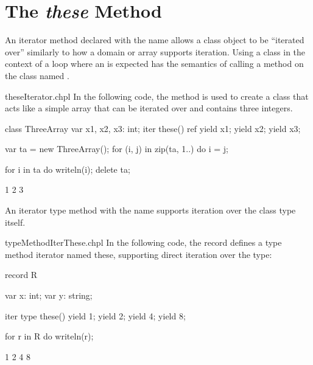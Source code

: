 \section{The {\em these} Method}
\label{The_these_Method}

An iterator method declared with the name  allows a class object to be
``iterated over'' similarly to how a domain or array supports iteration.
Using a class in the context of a loop where
an  is expected has the semantics of calling
a method on the class named .

\begin{chapelexample}{theseIterator.chpl}
In the following code, the  method is used to create a
class that acts like a simple array that can be iterated over and
contains three integers.
\begin{chapel}
class ThreeArray {
  var x1, x2, x3: int;
  iter these() ref {
    yield x1;
    yield x2;
    yield x3;
  }
}
\end{chapel}
\begin{chapelpost}
var ta = new ThreeArray();
for (i, j) in zip(ta, 1..) do
  i = j;

for i in ta do
  writeln(i);
delete ta;
\end{chapelpost}
\begin{chapeloutput}
1
2
3
\end{chapeloutput}

\end{chapelexample}

An iterator type method with the name  supports iteration
over the class type itself.

\begin{chapelexample}{typeMethodIterThese.chpl}
In the following code, the record  defines a type method
iterator named these, supporting direct iteration over the type:
\begin{chapel}
record R {
  var x: int;
  var y: string;

  iter type these() {
    yield 1;
    yield 2;
    yield 4;
    yield 8;
  }
}

for r in R do
  writeln(r);
\end{chapel}
\begin{chapeloutput}
1
2
4
8
\end{chapeloutput}
\end{chapelexample}

